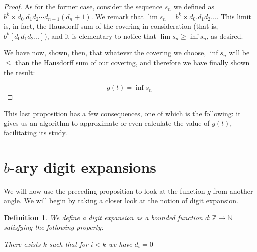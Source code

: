 \documentclass[11pt]{amsart}
\newcommand{\Z}{\mathbb{Z}}
\newcommand{\N}{\mathbb{N}}
\newtheorem{definition}{Definition}
\begin{document}
\begin{proof}
As for the former case, consider the sequence $s_n$ we defined as $b^k \times d_0 . d_1 d_2 \cdots d_{n-1} (d_n + 1)$. We remark that $\lim s_n = b^k \times d_0 . d_1 d_2 \dots$. This limit is, in fact, the Hausdorff sum of the covering in consideration (that is, $b^k [d_0 d_1 d_2 \dots]$), and it is elementary to notice that $\lim s_n \geq \inf s_n$, as desired.

We have now, shown, then, that whatever the covering we choose, $\inf s_n$ will be $\leq$ than the Hausdorff sum of our covering, and therefore we have finally shown the result:

\[ g(t) = \inf s_n \]

\iffalse
Now, to show we can assume all intervals to be disjoint: fix any point $a$ in $\cup I_i$. Define $J_a$ to be \emph{the biggest interval in $A$ containing $a$}. We propose, now, that the covering $A' = \{ J_a \}$ covers exactly the same points as $A$, while having a Hausdorff sum less than or equal to that of $A$, as well as having all its intervals be disjoint.

The first two properties are trivial, so we devote our attention only to the third one: suppose, for the sake of argument, that $J_a$ and $J_b$ are not disjoint. The structure of the $b$-ary intervals mandates that either $J_a \subseteq J_b$ or $J_b \subseteq J_a$; suppose the former for the sake of argument. Then, $a \in J_b$, which implies $J_a$ is of length greater than or equal to that of $J_b$ (by definition), and so, in fact, $J_a = J_b$.

This digression completed, we may go back to the problem at hand.
\fi
\end{proof}

This last proposition has a few consequences, one of which is the following: it gives us an algorithm to approximate or even calculate the value of $g(t)$, facilitating its study.

\section{$b$-ary digit expansions}

We will now use the preceding proposition to look at the function $g$ from another angle. We will begin by taking a closer look at the notion of digit expansion.

\begin{definition}
We define a \emph{digit expansion} as a \emph{bounded} function $d : \Z \to \N$ satisfying the following property:

\begin{center}
There exists $k$ such that for $i < k$ we have $d_i = 0$
\end{center}
\end{definition}
\end{document}
